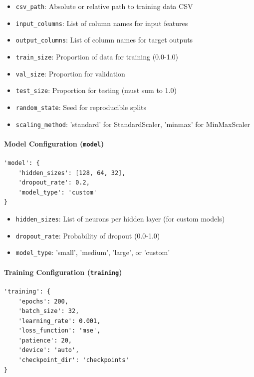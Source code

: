 \documentclass[11pt,a4paper]{article}
\begin{document}
\begin{itemize}
    \item \texttt{csv\_path}: Absolute or relative path to training data CSV
    \item \texttt{input\_columns}: List of column names for input features
    \item \texttt{output\_columns}: List of column names for target outputs
    \item \texttt{train\_size}: Proportion of data for training (0.0-1.0)
    \item \texttt{val\_size}: Proportion for validation
    \item \texttt{test\_size}: Proportion for testing (must sum to 1.0)
    \item \texttt{random\_state}: Seed for reproducible splits
    \item \texttt{scaling\_method}: 'standard' for StandardScaler, 'minmax' for MinMaxScaler
\end{itemize}

\paragraph{Model Configuration (\texttt{model})}

\begin{lstlisting}
'model': {
    'hidden_sizes': [128, 64, 32],
    'dropout_rate': 0.2,
    'model_type': 'custom'
}
\end{lstlisting}

\begin{itemize}
    \item \texttt{hidden\_sizes}: List of neurons per hidden layer (for custom models)
    \item \texttt{dropout\_rate}: Probability of dropout (0.0-1.0)
    \item \texttt{model\_type}: 'small', 'medium', 'large', or 'custom'
\end{itemize}

\paragraph{Training Configuration (\texttt{training})}

\begin{lstlisting}
'training': {
    'epochs': 200,
    'batch_size': 32,
    'learning_rate': 0.001,
    'loss_function': 'mse',
    'patience': 20,
    'device': 'auto',
    'checkpoint_dir': 'checkpoints'
}
\end{lstlisting}
\end{document}
